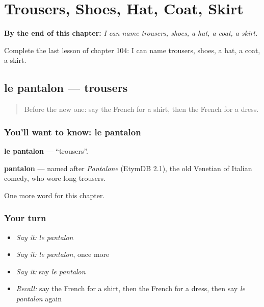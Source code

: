 
\chapter{Trousers, Shoes, Hat, Coat, Skirt}
\label{ch:fr-trousers-shoes-hat-coat-skirt}

\begin{chapteropening}
\textbf{By the end of this chapter:} \emph{I can name trousers, shoes, a hat, a coat, a skirt.}

Complete the last lesson of chapter 104: I can name trousers, shoes, a hat, a coat, a skirt.
\end{chapteropening}

\section[le pantalon]{le pantalon — trousers}

\label{lesson:FR-C104-pantalon}



\begin{quote}
Before the new one: say the French for a shirt, then the French for a dress.
\end{quote}

\subsection*{You'll want to know: le pantalon}
\textbf{le pantalon} — \textquotedblleft{}trousers\textquotedblright{}.

\begin{cousinweb}
\textbf{pantalon} — named after \emph{Pantalone} (EtymDB 2.1), the old Venetian of Italian comedy, who wore long trousers.
\end{cousinweb}

\begin{grammarlens}[title={What you've built}]
One more word for this chapter.
\end{grammarlens}

\subsection*{Your turn}
\begin{itemize}
\raggedright
  \item \emph{Say it:} \emph{le pantalon}
  \item \emph{Say it:} \emph{le pantalon}, once more
  \item \emph{Say it:} say \emph{le pantalon}
  \item \emph{Recall:} say the French for a shirt, then the French for a dress, then say \emph{le pantalon} again
\end{itemize}

